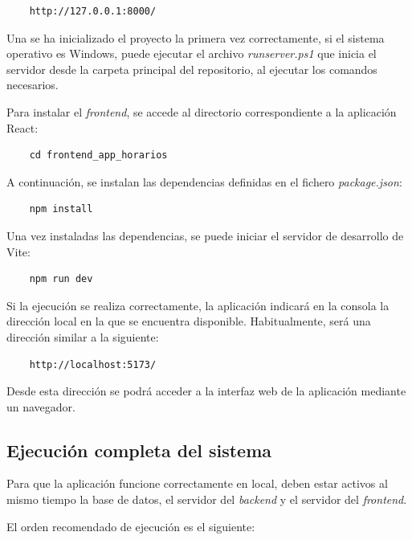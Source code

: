 \begin{verbatim}
	http://127.0.0.1:8000/
\end{verbatim}

Una se ha inicializado el proyecto la primera vez correctamente, si el sistema operativo es Windows, puede ejecutar el archivo \textit{runserver.ps1} que inicia el servidor desde la carpeta principal del repositorio, al ejecutar los comandos necesarios.

Para instalar el \textit{frontend}, se accede al directorio correspondiente a la aplicación React:

\begin{verbatim}
	cd frontend_app_horarios
\end{verbatim}

A continuación, se instalan las dependencias definidas en el fichero \textit{package.json}:

\begin{verbatim}
	npm install
\end{verbatim}

Una vez instaladas las dependencias, se puede iniciar el servidor de desarrollo de Vite:

\begin{verbatim}
	npm run dev
\end{verbatim}

Si la ejecución se realiza correctamente, la aplicación indicará en la consola la dirección local en la que se encuentra disponible. Habitualmente, será una dirección similar a la siguiente:

\begin{verbatim}
	http://localhost:5173/
\end{verbatim}

Desde esta dirección se podrá acceder a la interfaz web de la aplicación mediante un navegador.

\subsection{Ejecución completa del sistema}

Para que la aplicación funcione correctamente en local, deben estar activos al mismo tiempo la base de datos, el servidor del \textit{backend} y el servidor del \textit{frontend}.

El orden recomendado de ejecución es el siguiente:

